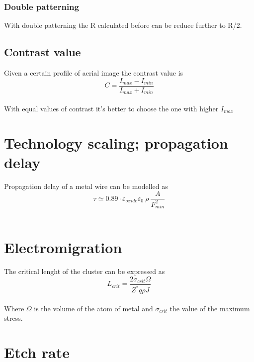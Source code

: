 \subsubsection{Double patterning}
With double patterning the R calculated before can be reduce further to R/2.\\



\subsection{Contrast value}
Given a certain profile of aerial image the contrast value is 
\begin{equation}
C=\frac{I_{max}-I_{min}}{I_{max}+I_{min}}
\end{equation}
\\
With equal values of contrast it's better to choose the one with higher $I_{max}$





\section{Technology scaling; propagation delay}
Propagation delay of a metal wire can be modelled as
\begin{equation}
\tau\simeq 0.89 \cdot \varepsilon_{oxide}\varepsilon_0 \ \rho \  \frac{A}{F_{min}^2} 
\end{equation}
\\


\section{Electromigration}
The critical lenght of the cluster can be expressed as 
\begin{equation}
L_{crit}=\frac{2\sigma_{crit}\Omega}{Z^*q\rho J}
\end{equation}
\\
Where $\Omega$ is the volume of the atom of metal and $\sigma_{crit}$ the value of the maximum stress.\\


\section{Etch rate}

